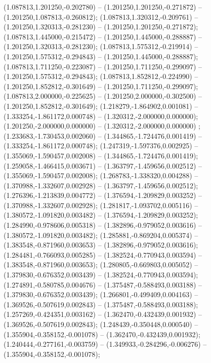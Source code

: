  (1.087813,1.201250,-0.202780) -- (1.201250,1.201250,-0.271872) -- (1.201250,1.087813,-0.260812);
 (1.087813,1.320312,-0.209761) -- (1.201250,1.320313,-0.281230) -- (1.201250,1.201250,-0.271872);
 (1.087813,1.445000,-0.215472) -- (1.201250,1.445000,-0.288887) -- (1.201250,1.320313,-0.281230);
 (1.087813,1.575312,-0.219914) -- (1.201250,1.575312,-0.294843) -- (1.201250,1.445000,-0.288887);
 (1.087813,1.711250,-0.223087) -- (1.201250,1.711250,-0.299097) -- (1.201250,1.575312,-0.294843);
 (1.087813,1.852812,-0.224990) -- (1.201250,1.852812,-0.301649) -- (1.201250,1.711250,-0.299097);
 (1.087813,2.000000,-0.225625) -- (1.201250,2.000000,-0.302500) -- (1.201250,1.852812,-0.301649);
 (1.218279,-1.864902,0.001081) -- (1.333254,-1.861172,0.000748) -- (1.320312,-2.000000,0.000000);
 (1.201250,-2.000000,0.000000) -- (1.320312,-2.000000,0.000000) ;
 (1.233683,-1.730453,0.002060) -- (1.344865,-1.724476,0.001419) -- (1.333254,-1.861172,0.000748);
 (1.247319,-1.597376,0.002925) -- (1.355069,-1.590457,0.002008) -- (1.344865,-1.724476,0.001419);
 (1.259058,-1.466415,0.003671) -- (1.363797,-1.459656,0.002512) -- (1.355069,-1.590457,0.002008);
 (1.268783,-1.338320,0.004288) -- (1.370988,-1.332607,0.002928) -- (1.363797,-1.459656,0.002512);
 (1.276396,-1.213839,0.004772) -- (1.376594,-1.209829,0.003252) -- (1.370988,-1.332607,0.002928);
 (1.281817,-1.093702,0.005116) -- (1.380572,-1.091820,0.003482) -- (1.376594,-1.209829,0.003252);
 (1.284990,-0.978606,0.005318) -- (1.382896,-0.979052,0.003616) -- (1.380572,-1.091820,0.003482);
 (1.285881,-0.869204,0.005374) -- (1.383548,-0.871960,0.003653) -- (1.382896,-0.979052,0.003616);
 (1.284481,-0.766093,0.005285) -- (1.382524,-0.770943,0.003594) -- (1.383548,-0.871960,0.003653);
 (1.280805,-0.669803,0.005052) -- (1.379830,-0.676352,0.003439) -- (1.382524,-0.770943,0.003594);
 (1.274891,-0.580785,0.004676) -- (1.375487,-0.588493,0.003188) -- (1.379830,-0.676352,0.003439);
 (1.266801,-0.499409,0.004163) -- (1.369526,-0.507619,0.002843) -- (1.375487,-0.588493,0.003188);
 (1.257269,-0.424351,0.003162) -- (1.362470,-0.432439,0.001932) -- (1.369526,-0.507619,0.002843);
 (1.248439,-0.350448,0.000540) -- (1.355904,-0.358152,-0.001078) -- (1.362470,-0.432439,0.001932);
 (1.240444,-0.277161,-0.003759) -- (1.349933,-0.284296,-0.006276) -- (1.355904,-0.358152,-0.001078);
